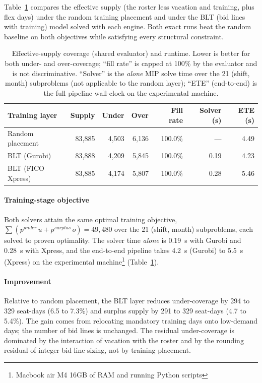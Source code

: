 \documentclass[preprint,12pt]{elsarticle}
\begin{document}
   Table~\ref{tab:coverage} compares the effective supply (the roster less vacation and training, plus flex days) under the random training placement and under the BLT (bid lines with training) model solved with each engine. Both exact runs beat the random baseline on both objectives while satisfying every structural constraint.

   \begin{table}[t]
      \centering
      \caption{Effective-supply coverage (shared evaluator) and runtime. Lower is better for both under- and over-coverage; ``fill rate'' is capped at 100\% by the evaluator and is not discriminative. ``Solver'' is the \emph{alone} MIP solve time over the 21 (shift, month) subproblems (not applicable to the random layer); ``ETE'' (end-to-end) is the full pipeline wall-clock on the experimental machine.}
      \label{tab:coverage}
      \small
      \setlength{\tabcolsep}{4pt}
      \begin{tabular}{lrrrrrr}
      \toprule
      Training layer & Supply & Under & Over & Fill rate & Solver (s) & ETE (s) \\
      \midrule
      Random placement  & 83,885 & 4,503 & 6,136 & 100.0\% & --- & 4.49 \\
      BLT (Gurobi)      & 83,888 & 4,209 & 5,845 & 100.0\% & 0.19 & 4.23 \\
      BLT (FICO Xpress) & 83,885 & 4,174 & 5,807 & 100.0\% & 0.28 & 5.46 \\
      \bottomrule
      \end{tabular}
   \end{table}

   \paragraph{Training-stage objective} Both solvers attain the same optimal training objective, $\sum (p^{under}\,u + p^{surplus}\,o) = 49,480$ over the 21 (shift, month) subproblems, each solved to proven optimality. The solver time \emph{alone} is 0.19~s with Gurobi and 0.28~s with Xpress, and the end-to-end pipeline takes 4.2~s (Gurobi) to 5.5~s (Xpress) on the experimental machine\footnote{Macbook air M4 16GB of RAM and running Python scripts} (Table~\ref{tab:coverage}). 

   \paragraph{Improvement} Relative to random placement, the BLT layer reduces under-coverage by 294 to 329 seat-days (6.5 to 7.3\%) and surplus supply by 291 to 329 seat-days (4.7 to 5.4\%). The gain comes from relocating mandatory training days onto low-demand days; the number of bid lines is unchanged. The residual under-coverage is dominated by the interaction of vacation with the roster and by the rounding residual of integer bid line sizing, not by training placement.
\end{document}
